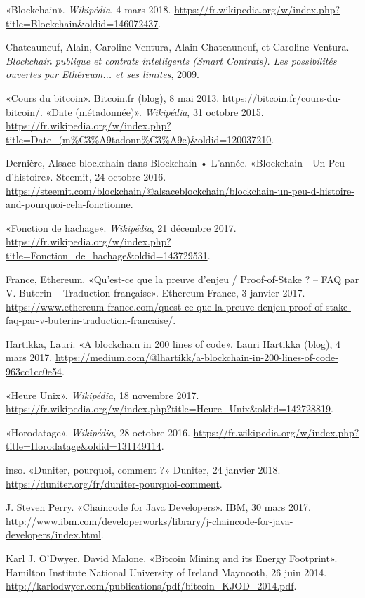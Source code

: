 \documentclass{article}
\begin{document}
«Blockchain». \textit{Wikipédia}, 4 mars 2018. \url{https://fr.wikipedia.org/w/index.php?title=Blockchain&oldid=146072437}.

Chateauneuf, Alain, Caroline Ventura, Alain Chateauneuf, et Caroline Ventura. \textit{Blockchain publique et contrats intelligents (Smart Contrats). Les possibilités ouvertes par Ethéreum... et ses limites}, 2009.

«Cours du bitcoin». Bitcoin.fr (blog), 8 mai 2013. https://bitcoin.fr/cours-du-bitcoin/.
«Date (métadonnée)». \textit{Wikipédia}, 31 octobre 2015. \url{https://fr.wikipedia.org/w/index.php?title=Date_(m\%C3\%A9tadonn\%C3\%A9e)&oldid=120037210}.

Dernière, Alsace blockchain dans Blockchain • L’année. «Blockchain - Un Peu d’histoire». Steemit, 24 octobre 2016. \url{https://steemit.com/blockchain/@alsaceblockchain/blockchain-un-peu-d-histoire-and-pourquoi-cela-fonctionne}.

«Fonction de hachage». \textit{Wikipédia}, 21 décembre 2017. \url{https://fr.wikipedia.org/w/index.php?title=Fonction_de_hachage&oldid=143729531}.

France, Ethereum. «Qu’est-ce que la preuve d’enjeu / Proof-of-Stake ? – FAQ par V. Buterin – Traduction française». Ethereum France, 3 janvier 2017. \url{https://www.ethereum-france.com/quest-ce-que-la-preuve-denjeu-proof-of-stake-faq-par-v-buterin-traduction-francaise/}.

Hartikka, Lauri. «A blockchain in 200 lines of code». Lauri Hartikka (blog), 4 mars 2017. \url{https://medium.com/@lhartikk/a-blockchain-in-200-lines-of-code-963cc1cc0e54}.

«Heure Unix». \textit{Wikipédia}, 18 novembre 2017. \url{https://fr.wikipedia.org/w/index.php?title=Heure_Unix&oldid=142728819}.

«Horodatage». \textit{Wikipédia}, 28 octobre 2016. \url{https://fr.wikipedia.org/w/index.php?title=Horodatage&oldid=131149114}.

inso. «Duniter, pourquoi, comment ?» Duniter, 24 janvier 2018. \url{https://duniter.org/fr/duniter-pourquoi-comment}.

J. Steven Perry. «Chaincode for Java Developers». IBM, 30 mars 2017. \url{http://www.ibm.com/developerworks/library/j-chaincode-for-java-developers/index.html}.

Karl J. O’Dwyer, David Malone. «Bitcoin Mining and its Energy Footprint». Hamilton Institute National University of Ireland Maynooth, 26 juin 2014. \url{http://karlodwyer.com/publications/pdf/bitcoin_KJOD_2014.pdf}.
\end{document}
